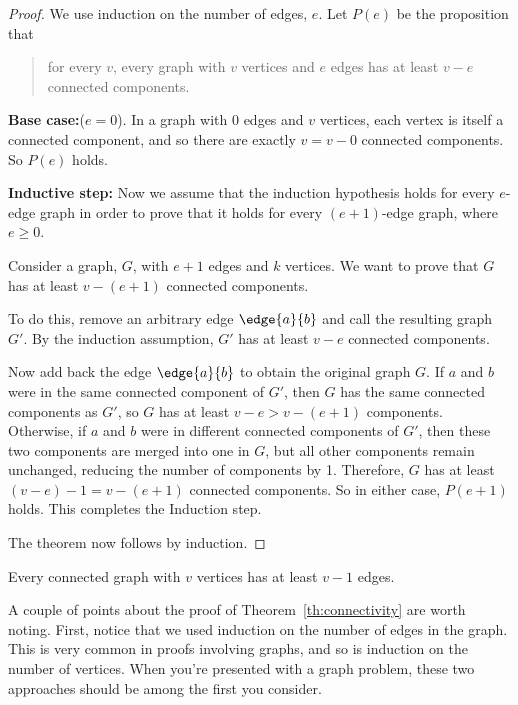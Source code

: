 \begin{proof}
We use induction on the number of edges, $e$.  Let $P(e)$ be the
proposition that
\begin{quote}
for every $v$, every graph with $v$ vertices and $e$ edges has at least
$v-e$ connected components.
\end{quote}

\textbf{Base case:}($e=0$).  In a graph with 0 edges and $v$ vertices,
each vertex is itself a connected component, and so there are exactly $v =
v - 0$ connected components.  So $P(e)$ holds.

\textbf{Inductive step:} Now we assume that the induction hypothesis holds
for every $e$-edge graph in order to prove that it holds for every
$(e+1)$-edge graph, where $e \geq 0$.

Consider a graph, $G$, with $e + 1$ edges and $k$ vertices.  We want to
prove that $G$ has at least $v - (e+1)$ connected components.

To do this, remove an arbitrary edge $\edge{a}{b}$ and call the resulting
graph $G'$.  By the induction assumption, $G'$ has at least $v - e$
connected components.

Now add back the edge $\edge{a}{b}$ to obtain the original graph $G$.  If
$a$ and $b$ were in the same connected component of $G'$, then $G$ has the
same connected components as $G'$, so $G$ has at least $v -e > v - (e+1)$
components.  Otherwise, if $a$ and $b$ were in different connected
components of $G'$, then these two components are merged into one in $G$,
but all other components remain unchanged, reducing the number of
components by 1.  Therefore, $G$ has at least $(v - e) - 1 = v - (e+1)$
connected components.  So in either case, $P(e+1)$ holds.  This completes
the Induction step.

The theorem now follows by induction.
\end{proof}

\begin{corollary}
\label{cor:n-1}
Every connected graph with $v$ vertices has at least $v - 1$ edges.
\end{corollary}

A couple of points about the proof of Theorem~\ref{th:connectivity} are
worth noting.  First, notice that we used induction on the number of edges
in the graph.  This is very common in proofs involving graphs, and so is
induction on the number of vertices.  When you're presented with a graph
problem, these two approaches should be among the first you consider.

